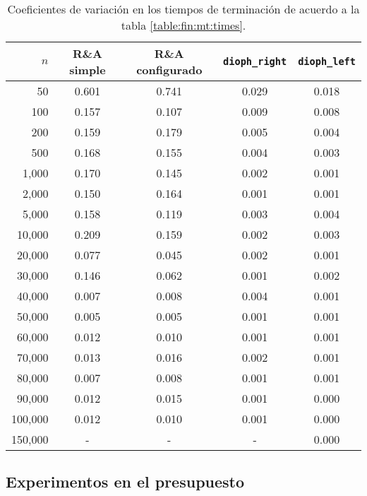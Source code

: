 \begin{table}
	\centering
	\begin{tabular}{rcccc} \toprule
		$n$ & R\&A simple & R\&A configurado & \texttt{dioph\_right} & \texttt{dioph\_left} \\ \midrule
		50       & 0.601 & 0.741 & 0.029 & 0.018 \\
		100      & 0.157 & 0.107 & 0.009 & 0.008 \\
		200      & 0.159 & 0.179 & 0.005 & 0.004 \\
		500      & 0.168 & 0.155 & 0.004 & 0.003 \\ \midrule
		1,000     & 0.170 & 0.145 & 0.002 & 0.001 \\
		2,000     & 0.150 & 0.164 & 0.001 & 0.001 \\
		5,000     & 0.158 & 0.119 & 0.003 & 0.004 \\
		10,000    & 0.209 & 0.159 & 0.002 & 0.003 \\ \midrule
		20,000    & 0.077 & 0.045 & 0.002 & 0.001 \\
		30,000    & 0.146 & 0.062 & 0.001 & 0.002 \\
		40,000    & 0.007 & 0.008 & 0.004 & 0.001 \\
		50,000    & 0.005 & 0.005 & 0.001 & 0.001 \\ \midrule
		60,000    & 0.012 & 0.010 & 0.001 & 0.001 \\
		70,000    & 0.013 & 0.016 & 0.002 & 0.001 \\
		80,000    & 0.007 & 0.008 & 0.001 & 0.001 \\
		90,000    & 0.012 & 0.015 & 0.001 & 0.000 \\ \midrule
		100,000   & 0.012 & 0.010 & 0.001 & 0.000 \\
		150,000 & - & - & - & 0.000 \\ \bottomrule
	\end{tabular}
	\caption{Coeficientes de variación en los tiempos de terminación de acuerdo a la tabla
	\ref{table:fin:mt:times}.}
	\label{table:fin:mt:cv}
\end{table}

\subsection{Experimentos en el presupuesto}
\label{subsec:exp:fin:rhs}
